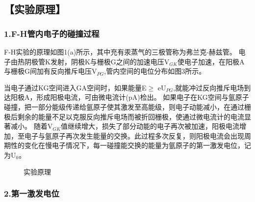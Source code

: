 \documentclass[12pt,a4paper,UTF8]{ctexart}
\begin{document}
\subsection*{【实验原理】}

	\subsubsection*{1.F-H管内电子的碰撞过程}
F-H实验的原理如图1(a)所示，其中充有汞蒸气的三极管称为弗兰克-赫兹管。
电子由热阴极管K发射，阴极K与栅极G之间的加速电压V$_{GK}$使电子加速，在阳极A与栅极G间加有反向推斥电压V$_{PG}$,管内空间的电位分布如图3所示。

当电子通过KG空间进入GA空间时，如果能量E$\geqslant$ eU$_{PG}$,就能冲过反向推斥电场到达阳极A，形成阳极电流，可由微电流计(pA)检出。
如果电子在KG空间与氩原子碰撞，把一部分能级传递给氩原子使其激发至高能级，则电子动能减小，在通过栅极后剩余的能量不足以克服反向推斥电场而被折回栅极，使通过微电流计的电流显著减小。
随着V$_{GK}$值继续增大，损失了部分动能的电子再次被加速，阳极电流增加，至电子与氩原子再次发生能量的交换。此过程多次反复，则阳极电流会出现周期性的变化在慢电子情况下，每一碰撞能交换的能量为氩原子的第一激发电位，记为U$_0$。
	\begin{figure}[htbp]
		\centering
		\caption{实验原理}
		\label{fig:tcvi}
	\end{figure}

	\subsubsection*{2.第一激发电位}
	
\end{document}
